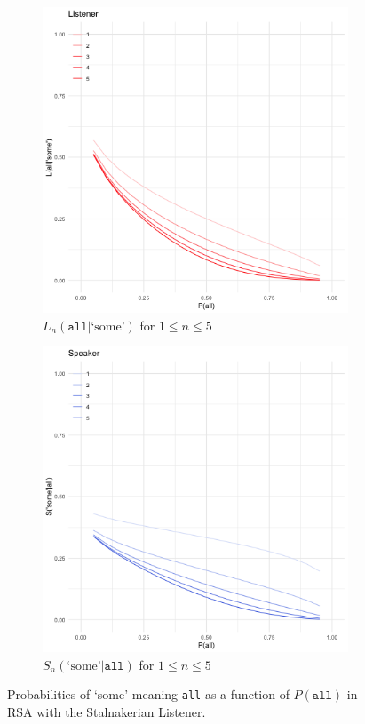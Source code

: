 \documentclass[12pt, a4paper, usenames, dvipsnames]{article}
\begin{document}
\begin{figure}[!htb]
  \begin{subfigure}{.48\linewidth} 
    \includegraphics[width=\textwidth]{graphs/sRSA-L.png}
    \caption{\(L_n(\texttt{all}|\text{`some'})\) for \(1\leq n\leq 5\)}
  \end{subfigure}
  \begin{subfigure}{.48\linewidth} 
    \includegraphics[width=\textwidth]{graphs/sRSA-S.png}
    \caption{\(S_n(\text{`some'}|\texttt{all})\) for \(1\leq n\leq 5\)}
  \end{subfigure}
  \caption{Probabilities of `some' meaning \texttt{all} as a function of \(P(\texttt{all})\) in RSA with the Stalnakerian Listener.}
  \label{fig:rsa}
\end{figure}
\end{document}
